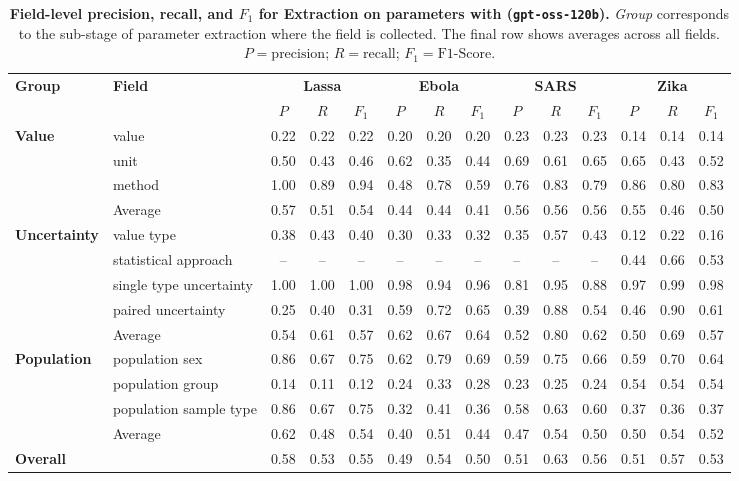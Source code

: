 \begin{table}[h]
\setlength{\tabcolsep}{3pt}
\centering
\caption{\textbf{Field-level precision, recall, and $F_1$ for Extraction on parameters with \name{} (\texttt{gpt-oss-120b}).} \textit{Group} corresponds to the sub-stage of parameter extraction where the field is collected. The final row shows averages across all fields. $P=\text{precision}$; $R=\text{recall}$; $F_1=\text{F1-Score}$.}
\label{tab:parameters_detailed_metrics}
\renewcommand{\arraystretch}{1}
{\footnotesize
\begin{tabular}{ll|ccc|ccc|ccc|ccc}
\toprule
\bf Group & \bf Field & \multicolumn{3}{c}{\textbf{Lassa}} & \multicolumn{3}{c}{\textbf{Ebola}} & \multicolumn{3}{c}{\textbf{SARS}} & \multicolumn{3}{c}{\textbf{Zika}} \\
 & & $P$ & $R$ & $F_1$ & $P$ & $R$ & $F_1$ & $P$ & $R$ & $F_1$ & $P$ & $R$ & $F_1$ \\
\midrule
\multirow{4}{*}{\textbf{Value}} & value & 0.22 & 0.22 & 0.22 & 0.20 & 0.20 & 0.20 & 0.23 & 0.23 & 0.23 & 0.14 & 0.14 & 0.14 \\
 & unit & 0.50 & 0.43 & 0.46 & 0.62 & 0.35 & 0.44 & 0.69 & 0.61 & 0.65 & 0.65 & 0.43 & 0.52 \\
 & method & 1.00 & 0.89 & 0.94 & 0.48 & 0.78 & 0.59 & 0.76 & 0.83 & 0.79 & 0.86 & 0.80 & 0.83 \\
\cmidrule{2-14}
 & Average & 0.57 & 0.51 & 0.54 & 0.44 & 0.44 & 0.41 & 0.56 & 0.56 & 0.56 & 0.55 & 0.46 & 0.50 \\
\midrule
\multirow{5}{*}{\textbf{Uncertainty}} & value type & 0.38 & 0.43 & 0.40 & 0.30 & 0.33 & 0.32 & 0.35 & 0.57 & 0.43 & 0.12 & 0.22 & 0.16 \\
 & statistical approach & -- & -- & -- & -- & -- & -- & -- & -- & -- & 0.44 & 0.66 & 0.53 \\
 & single type uncertainty & 1.00 & 1.00 & 1.00 & 0.98 & 0.94 & 0.96 & 0.81 & 0.95 & 0.88 & 0.97 & 0.99 & 0.98 \\
 & paired uncertainty & 0.25 & 0.40 & 0.31 & 0.59 & 0.72 & 0.65 & 0.39 & 0.88 & 0.54 & 0.46 & 0.90 & 0.61 \\
\cmidrule{2-14}
 & Average & 0.54 & 0.61 & 0.57 & 0.62 & 0.67 & 0.64 & 0.52 & 0.80 & 0.62 & 0.50 & 0.69 & 0.57 \\
\midrule
\multirow{4}{*}{\textbf{Population}} & population sex & 0.86 & 0.67 & 0.75 & 0.62 & 0.79 & 0.69 & 0.59 & 0.75 & 0.66 & 0.59 & 0.70 & 0.64 \\
 & population group & 0.14 & 0.11 & 0.12 & 0.24 & 0.33 & 0.28 & 0.23 & 0.25 & 0.24 & 0.54 & 0.54 & 0.54 \\
 & population sample type & 0.86 & 0.67 & 0.75 & 0.32 & 0.41 & 0.36 & 0.58 & 0.63 & 0.60 & 0.37 & 0.36 & 0.37 \\
\cmidrule{2-14}
 & Average & 0.62 & 0.48 & 0.54 & 0.40 & 0.51 & 0.44 & 0.47 & 0.54 & 0.50 & 0.50 & 0.54 & 0.52 \\
\midrule
\textbf{Overall} & & 0.58 & 0.53 & 0.55 & 0.49 & 0.54 & 0.50 & 0.51 & 0.63 & 0.56 & 0.51 & 0.57 & 0.53 \\
\bottomrule
\end{tabular}
}
\end{table}

